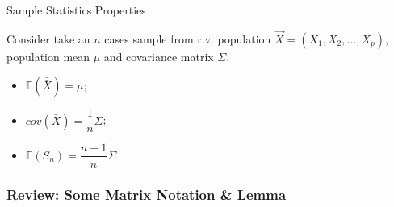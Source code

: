 \begin{point}
    \hypertarget{SampleStatisticsProperties}{Sample Statistics Properties}
\end{point}

    Consider take an $ n $ cases sample from r.v. population $ \vec{X}=(X_1,X_2,\ldots,X_p) $, population mean $ \mu $ and covariance matrix $ \Sigma  $.
    \begin{itemize}[topsep=6pt,itemsep=4pt]
        \item $ \mathbb{E}(\bar{\bar{X}})=\mu $;
        \item $ cov(\bar{X})=\dfrac{1}{n}\Sigma  $;
        \item $ \mathbb{E}(S_n)=\dfrac{n-1}{n}\Sigma  $
    \end{itemize}
    
        


\subsubsection{Review: Some Matrix Notation \& Lemma}\label{SubSubSectionMatrixNotationAndLemma}

